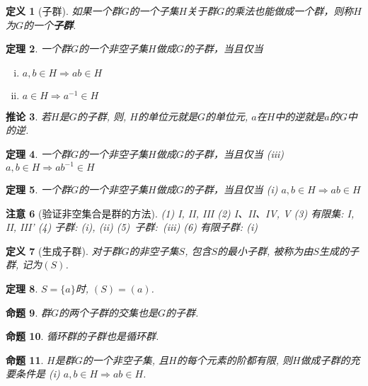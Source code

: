 \documentclass[UTF8]{ctexart}
\newtheorem{Definition}{定义}%
\newtheorem{Theorem}[Definition]{定理}
\newtheorem{Remark}[Definition]{注意}
\newtheorem{Corollary}[Definition]{推论}
\newtheorem{Proposition}[Definition]{命题}
\begin{document}
\begin{Definition}[子群]
如果一个群$G$的一个子集$H$关于群$G$的乘法也能做成一个群，则称$H$为$G$的一个\textbf{子群}.
\end{Definition}

\begin{Theorem}
一个群$G$的一个非空子集$H$做成$G$的子群，当且仅当
\begin{enumerate}[(i)]
\item $a, b \in H \Rightarrow ab \in H$
\item $a \in H \Rightarrow a^{-1} \in H$
\end{enumerate}
\end{Theorem}

\begin{Corollary}
若$H$是$G$的子群, 则, $H$的单位元就是$G$的单位元, $a$在$H$中的逆就是$a$的$G$中的逆.
\end{Corollary}

\begin{Theorem}
一个群$G$的一个非空子集$H$做成$G$的子群，当且仅当 (iii) $a, b \in H \Rightarrow ab^{-1} \in H$
\end{Theorem}

\begin{Theorem}
一个群$G$的一个非空\;\;子集$H$做成$G$的子群，当且仅当 (i) $a, b \in H \Rightarrow ab \in H$
\end{Theorem}

\begin{Remark}[验证非空集合是群的方法]
(1) I, II, III (2) I、II、IV, V (3) 有限集: I, II, III'
(4) 子群: (i), (ii) \mbox{(5) 子群: (iii)} (6) 有限子群: (i)
\end{Remark}

\begin{Definition}[生成子群]
对于群$G$的非空子集$S$, 包含$S$的最小子群, 被称为由$S$生成的子群, 记为$(S)$.
\end{Definition}

\begin{Theorem}
$S = \{a\}$时, $(S) = (a)$.
\end{Theorem}

\begin{Proposition}
群$G$的两个子群的交集也是$G$的子群.
\end{Proposition}

\begin{Proposition}
循环群的子群也是循环群.
\end{Proposition}

\begin{Proposition}
$H$是群$G$的一个非空子集, 且$H$的每个元素的阶都有限,
则$H$做成子群的充要条件是 (i) $a, b \in H \Rightarrow ab \in H$.
\end{Proposition}
\end{document}
